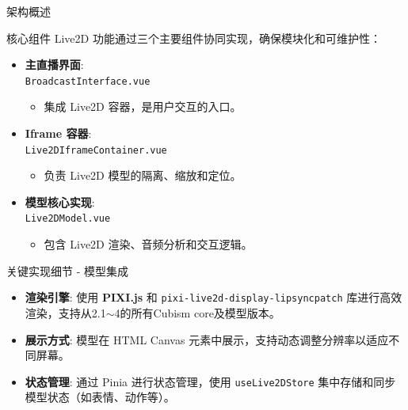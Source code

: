 \documentclass{beamer}
\begin{document}
\begin{frame}{架构概述}
    \begin{block}{核心组件}
        Live2D 功能通过三个主要组件协同实现，确保模块化和可维护性：
    \end{block}
    \begin{itemize}
        \item<1-> \textbf{主直播界面}:\\ \texttt{BroadcastInterface.vue}
        \begin{itemize}
            \item 集成 Live2D 容器，是用户交互的入口。
        \end{itemize}
        \bigskip
        \item<2-> \textbf{Iframe 容器}:\\ \texttt{Live2DIframeContainer.vue}
        \begin{itemize}
            \item 负责 Live2D 模型的隔离、缩放和定位。
        \end{itemize}
        \bigskip
        \item<3-> \textbf{模型核心实现}:\\ \texttt{Live2DModel.vue}
        \begin{itemize}
            \item 包含 Live2D 渲染、音频分析和交互逻辑。
        \end{itemize}
    \end{itemize}
\end{frame}
\begin{frame}{关键实现细节 - 模型集成}
    \begin{itemize}
        \item \textbf{渲染引擎}: 使用 \textbf{PIXI.js} 和 \texttt{pixi-live2d-display-lipsyncpatch} 库进行高效渲染，支持从2.1$\sim$4的所有Cubism core及模型版本。

        \pause
        \item \textbf{展示方式}: 模型在 HTML Canvas 元素中展示，支持动态调整分辨率以适应不同屏幕。
        \pause
        \item \textbf{状态管理}: 通过 Pinia 进行状态管理，使用 \texttt{useLive2DStore} 集中存储和同步模型状态（如表情、动作等）。
    \end{itemize}
\end{frame}
\end{document}
